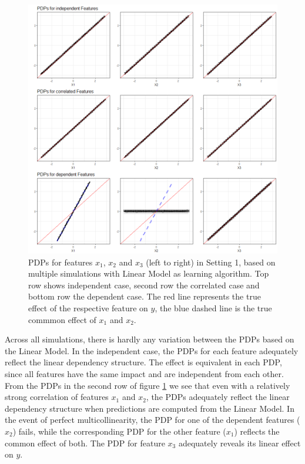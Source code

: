 \documentclass[
]{krantz}
\begin{document}
\begin{figure}

\includegraphics[width=1\linewidth]{images/VK_PDP_14_Set1_LM} \hfill{}

\caption{PDPs for features $x_1$, $x_2$ and $x_3$ (left to right) in Setting 1, based on multiple simulations with Linear Model as learning algorithm. Top row shows independent case, second row the correlated case and bottom row the dependent case. The red line represents the true effect of the respective feature on $y$, the blue dashed line is the true commmon effect of $x_1$ and $x_2$.}\label{fig:Figure14}
\end{figure}

Across all simulations, there is hardly any variation between the PDPs based on the Linear Model. In the independent case, the PDPs for each feature adequately reflect the linear dependency structure. The effect is equivalent in each PDP, since all features have the same impact and are independent from each other. From the PDPs in the second row of figure \ref{fig:Figure14} we see that even with a relatively strong correlation of features \(x_1\) and \(x_2\), the PDPs adequately reflect the linear dependency structure when predictions are computed from the Linear Model. In the event of perfect multicollinearity, the PDP for one of the dependent features (\(x_2\)) fails, while the corresponding PDP for the other feature (\(x_1\)) reflects the common effect of both. The PDP for feature \(x_3\) adequately reveals its linear effect on \(y\).
\end{document}
